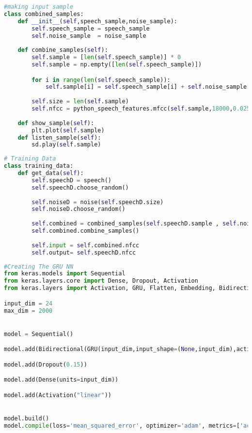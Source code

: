 \begin{lstlisting}[language=Python, label=lst:imputsample]
#making input sample 
class combined_samples:
    def __init__(self,speech_sample,noise_sample):
        self.speech_sample = speech_sample
        self.noise_sample  = noise_sample
    
    def combine_samples(self):
        self.sample = [len(self.speech_sample)] * 0
        self.sample = np.empty([len(self.speech_sample)])

        for i in range(len(self.speech_sample)):
            self.sample[i] = self.speech_sample[i] + self.noise_sample[i]
        
        self.size = len(self.sample)
        self.nfcc = python_speech_features.mfcc(self.sample,18000,0.025,0.01,24)
        
    def show_sample(self):
        plt.plot(self.sample)
    def listen_sample(self):
        sd.play(self.sample) 
\end{lstlisting}

\begin{lstlisting}[language=Python, label=lst:trainingdata]
# Training Data
class training_data:
    def get_data(self):
        self.speechD = speech()
        self.speechD.choose_random()
        
        self.noiseD = noise(self.speechD.size)
        self.noiseD.choose_random()
        
        self.combined = combined_samples(self.speechD.sample , self.noiseD.sample)
        self.combined.combine_samples()
        
        self.input = self.combined.nfcc
        self.output= self.speechD.nfcc
\end{lstlisting}

\begin{lstlisting}[language=Python, label=lst:gru nn]
#Creating The GRU NN
from keras.models import Sequential
from keras.layers.core import Dense, Dropout, Activation
from keras.layers import Activation, GRU, Flatten, Embedding, Bidirectional

input_dim = 24
max_dim = 2000


model = Sequential()

model.add(Bidirectional(GRU(input_dim,input_shape=(None,input_dim),activation='tanh',return_sequences=True)))

model.add(Dropout(0.15))

model.add(Dense(units=input_dim))

model.add(Activation("linear"))


model.build()
model.compile(loss='mean_squared_error', optimizer='adam', metrics=['accuracy'])

\end{lstlisting}

